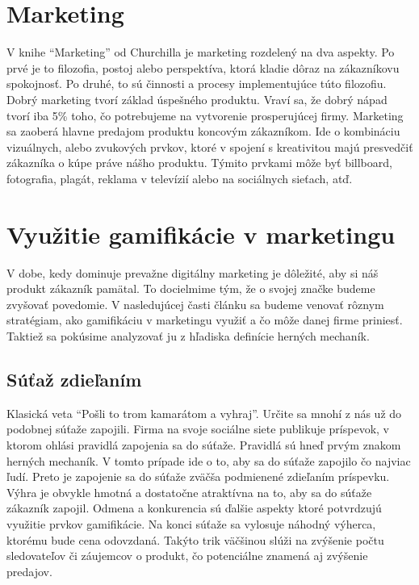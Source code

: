 \documentclass[10pt,twoside,slovak,a4paper]{article}
\begin{document}
\section{Marketing}\label{marketing}

	V knihe “Marketing” od Churchilla je marketing rozdelený na dva aspekty. \cite{churchill2017marketing}Po prvé je to filozofia, postoj alebo perspektíva, ktorá kladie dôraz na zákazníkovu spokojnosť. Po druhé, to sú činnosti a procesy implementujúce túto filozofiu.
	Dobrý marketing tvorí základ úspešného produktu. Vraví sa, že dobrý nápad tvorí iba 5\% toho, čo potrebujeme na vytvorenie prosperujúcej firmy. Marketing sa zaoberá hlavne predajom produktu koncovým zákazníkom. Ide o kombináciu vizuálnych, alebo zvukových prvkov, ktoré v spojení s kreativitou majú presvedčiť zákazníka o kúpe práve nášho produktu. Týmito prvkami môže byť billboard, fotografia, plagát, reklama v televízií alebo na sociálnych sieťach, atď.


\section{Využitie gamifikácie v marketingu}\label{pouzitie-v-marketingu}
V dobe, kedy dominuje prevažne digitálny marketing je dôležité, aby si náš produkt zákazník pamätal. To docielmime tým, že o svojej značke budeme zvyšovať povedomie. V nasledujúcej časti článku sa budeme venovať rôznym stratégiam, ako gamifikáciu v marketingu využiť a čo môže danej firme priniesť. Taktiež sa pokúsime analyzovať ju z hľadiska definície herných mechaník.

\subsection{Súťaž zdieľaním}
Klasická veta “Pošli to trom kamarátom a vyhraj”. Určite sa mnohí z nás už do podobnej súťaže zapojili. Firma na svoje sociálne siete publikuje príspevok, v ktorom ohlási pravidlá zapojenia sa do súťaže. Pravidlá sú hneď prvým znakom herných mechaník. V tomto prípade ide o to, aby sa do súťaže zapojilo čo najviac ľudí. Preto je zapojenie sa do súťaže zväčša podmienené zdieľaním príspevku. Výhra je obvykle hmotná a dostatočne atraktívna na to, aby sa do súťaže zákazník zapojil. Odmena a konkurencia sú ďalšie aspekty ktoré potvrdzujú využitie prvkov gamifikácie. Na konci súťaže sa vylosuje náhodný výherca, ktorému bude cena odovzdaná. Takýto trik väčšinou slúži na zvýšenie počtu sledovateľov či záujemcov o produkt, čo potenciálne znamená aj zvýšenie predajov.
\end{document}
